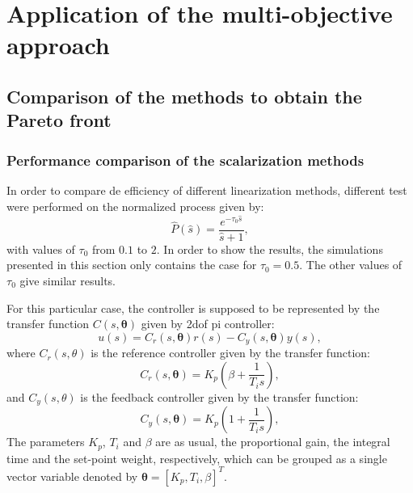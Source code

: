 \chapter{Application of the multi-objective approach}
\label{chap:ApplicationExamplesNoGUI}


\section{Comparison of the methods to obtain the Pareto front}
\label{sec:Comparison}
\subsection{Performance comparison of the scalarization methods}
In order to compare de efficiency of different linearization methods, different test were performed on the normalized process given by:
%
\begin{equation}
\hat{P}(\hat{s}) = \frac{e^{-\tau_0 \hat{s}}}{\hat{s}+1},
\label{eq:NormP}
\end{equation}
%
with values of $\tau_0$ from $0.1$ to $2$. In order to show the results, the simulations presented in this section only contains the case for $\tau_0=0.5$. The other values of $\tau_0$ give similar results.

For this particular case, the controller is supposed to be represented by the transfer function $C(s,\bm{\theta})$ given by \gls{2dof} \gls{pi} controller:
\begin{equation}
u(s) = C_r(s,\bm{\theta}) r(s) - C_y(s,\bm{\theta}) y(s),
\label{eq:2PIControl}
\end{equation}
where $C_r(s,\theta)$ is the reference controller given by the transfer function:
\begin{equation}
C_r(s,\bm{\theta})= K_p \left(\beta + \frac{1}{T_i s} \right),
\label{eq:CrControl}
\end{equation}
%
and $C_y(s,\theta)$ is the feedback controller given by the transfer function:
\begin{equation}
C_y(s,\bm{\theta})=K_p \left(1 + \frac{1}{T_i s} \right),
\label{eq:CyControl}
\end{equation}
%
The parameters $K_p$, $T_i$ and $\beta$ are as usual, the proportional gain, the integral time and the set-point weight, respectively, which can be grouped as a single vector variable denoted by $\bm{\theta}=\left[K_p,T_i,\beta\right]^{T}$.

